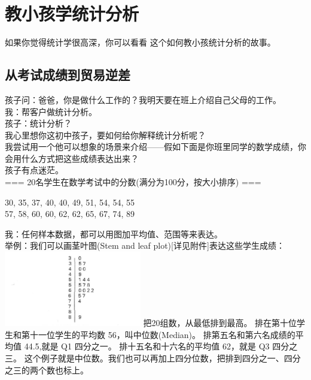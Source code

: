 \chapter{教小孩学统计分析} %

如果你觉得统计学很高深，你可以看看 这个如何教小孩统计分析的故事。

\hypertarget{ux4eceux8003ux8bd5ux6210ux7ee9ux5230ux8d38ux6613ux9006ux5dee}{%
\section{从考试成绩到贸易逆差}\label{ux4eceux8003ux8bd5ux6210ux7ee9ux5230ux8d38ux6613ux9006ux5dee}}

孩子问：爸爸，你是做什么工作的？我明天要在班上介绍自己父母的工作。\\
我：帮客户做统计分析。\\
孩子：统计分析？\\
我心里想你这初中孩子，要如何给你解释统计分析呢？\\
我尝试用一个他可以想象的场景来介绍------假如下面是你班里同学的数学成绩，你会用什么方式把这些成绩表达出来？\\
孩子有点迷茫。\\
=== 20名学生在数学考试中的分数(满分为100分，按大小排序) ===

30, 35, 37, 40, 40, 49, 51, 54, 54, 55\\
57, 58, 60, 60, 62, 62, 65, 67, 74, 89

我：任何样本数据，都可以用图加平均值、范围等来表达。\\
举例：我们可以画茎叶图(Stem and leaf
plot){[}详见附件{]}表达这些学生成绩：\\


\includegraphics[width=6cm]{MA_FA2_10.png}
把20组数，从最低排到最高。 排在第十位学生和第十一位学生的平均数
56，叫中位数(Median)。 排第五名和第六名成绩的平均值 44.5,就是 Q1
四分之一。 排十五名和十六名的平均值 62，就是 Q3 四分之三。
这个例子就是中位数。我们也可以再加上四分位数，把排到四分之一、四分之三的两个数也标上。

